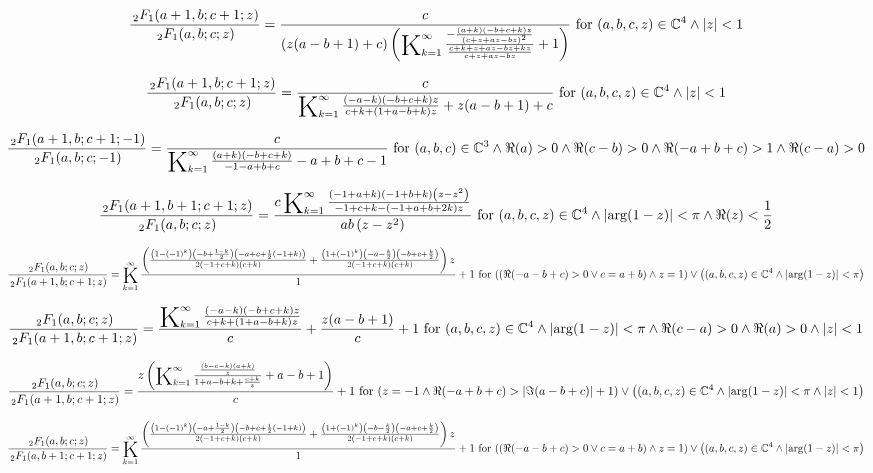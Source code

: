 \documentclass{article}
\newcommand{\bigK}{\mathop{\raisebox{-5pt}{\huge K}}}
\begin{document}
\[\frac{\, _2F_1(a+1,b;c+1;z)}{\, _2F_1(a,b;c;z)}=\frac{c}{(z (a-b+1)+c) \left(\bigK_{k=1}^{\infty}\frac{-\frac{(a+k) (-b+c+k) z}{(c+z+a z-b z)^2}}{\frac{c+k+z+a z-b z+k z}{c+z+a z-b z}}+1\right)}\text{ for }(a,b,c,z)\in \mathbb{C}^4\land \left| z\right| <1\] 

\[\frac{\, _2F_1(a+1,b;c+1;z)}{\, _2F_1(a,b;c;z)}=\frac{c}{\bigK_{k=1}^{\infty}\frac{(-a-k) (-b+c+k) z}{c+k+(1+a-b+k) z}+z (a-b+1)+c}\text{ for }(a,b,c,z)\in \mathbb{C}^4\land \left| z\right| <1\] 

\[\frac{\, _2F_1(a+1,b;c+1;-1)}{\, _2F_1(a,b;c;-1)}=\frac{c}{\bigK_{k=1}^{\infty}\frac{(a+k) (-b+c+k)}{-1-a+b+c}-a+b+c-1}\text{ for }(a,b,c)\in \mathbb{C}^3\land \Re(a)>0\land \Re(c-b)>0\land \Re(-a+b+c)>1\land \Re(c-a)>0\] 

\[\frac{\, _2F_1(a+1,b+1;c+1;z)}{\, _2F_1(a,b;c;z)}=\frac{c \bigK_{k=1}^{\infty}\frac{(-1+a+k) (-1+b+k) \left(z-z^2\right)}{-1+c+k-(-1+a+b+2 k) z}}{a b \left(z-z^2\right)}\text{ for }(a,b,c,z)\in \mathbb{C}^4\land \left| \arg (1-z)\right| <\pi \land \Re(z)<\frac{1}{2}\] 

\[\frac{\, _2F_1(a,b;c;z)}{\, _2F_1(a+1,b;c+1;z)}=\bigK_{k=1}^{\infty}\frac{\left(\frac{\left(1-(-1)^k\right) \left(-b+\frac{1-k}{2}\right) \left(-a+c+\frac{1}{2} (-1+k)\right)}{2 (-1+c+k) (c+k)}+\frac{\left(1+(-1)^k\right) \left(-a-\frac{k}{2}\right) \left(-b+c+\frac{k}{2}\right)}{2 (-1+c+k) (c+k)}\right) z}{1}+1\text{ for }((\Re(-a-b+c)>0\lor c=a+b)\land z=1)\lor \left((a,b,c,z)\in \mathbb{C}^4\land \left| \arg (1-z)\right| <\pi \right)\] 

\[\frac{\, _2F_1(a,b;c;z)}{\, _2F_1(a+1,b;c+1;z)}=\frac{\bigK_{k=1}^{\infty}\frac{(-a-k) (-b+c+k) z}{c+k+(1+a-b+k) z}}{c}+\frac{z (a-b+1)}{c}+1\text{ for }(a,b,c,z)\in \mathbb{C}^4\land \left| \arg (1-z)\right| <\pi \land \Re(c-a)>0\land \Re(a)>0\land \left| z\right| <1\] 

\[\frac{\, _2F_1(a,b;c;z)}{\, _2F_1(a+1,b;c+1;z)}=\frac{z \left(\bigK_{k=1}^{\infty}\frac{\frac{(b-c-k) (a+k)}{z}}{1+a-b+k+\frac{c+k}{z}}+a-b+1\right)}{c}+1\text{ for }(z=-1\land \Re(-a+b+c)>\left| \Im(a-b+c)\right| +1)\lor \left((a,b,c,z)\in \mathbb{C}^4\land \left| \arg (1-z)\right| <\pi \land \left| z\right| <1\right)\] 

\[\frac{\, _2F_1(a,b;c;z)}{\, _2F_1(a,b+1;c+1;z)}=\bigK_{k=1}^{\infty}\frac{\left(\frac{\left(1-(-1)^k\right) \left(-a+\frac{1-k}{2}\right) \left(-b+c+\frac{1}{2} (-1+k)\right)}{2 (-1+c+k) (c+k)}+\frac{\left(1+(-1)^k\right) \left(-b-\frac{k}{2}\right) \left(-a+c+\frac{k}{2}\right)}{2 (-1+c+k) (c+k)}\right) z}{1}+1\text{ for }((\Re(-a-b+c)>0\lor c=a+b)\land z=1)\lor \left((a,b,c,z)\in \mathbb{C}^4\land \left| \arg (1-z)\right| <\pi \right)\] 
\end{document}
